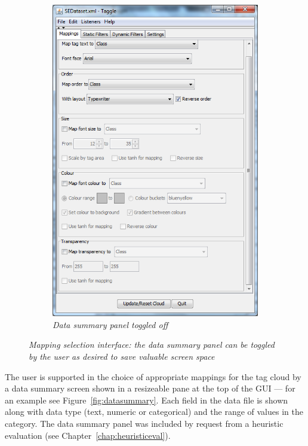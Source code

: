 \begin{figure}[!htb]
\begin{subfigure}{.5\textwidth}
  \centering
  \includegraphics[scale=0.40]{mappings2.png}
  \caption{\textit{Data summary panel toggled off}}
\end{subfigure}
  \caption{\textit{Mapping selection interface: the data summary panel can be toggled by the user as desired to save valuable screen space}}
  \label{fig:mappingselection}
\end{figure}

The user is supported in the choice of appropriate mappings for the tag cloud by a data summary screen shown in a resizeable pane at the top of the GUI --- for an example see Figure~\vref{fig:datasummary}. Each field in the data file is shown along with data type (text, numeric or categorical) and the range of values in the category.  The data summary panel was included by request from a heuristic evaluation (see Chapter~\ref{chap:heuristiceval}).

